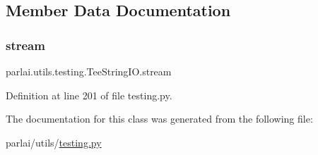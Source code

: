 \subsection{Member Data Documentation}
\mbox{\label{classparlai_1_1utils_1_1testing_1_1TeeStringIO_a4dc6e50f503b4679fe3b3fa0ebd729f1}} 
\subsubsection{\texorpdfstring{stream}{stream}}
{\footnotesize\ttfamily parlai.\+utils.\+testing.\+Tee\+String\+I\+O.\+stream}



Definition at line 201 of file testing.\+py.



The documentation for this class was generated from the following file\+:\begin{DoxyCompactItemize}
\item 
parlai/utils/\hyperlink{testing_8py}{testing.\+py}\end{DoxyCompactItemize}
